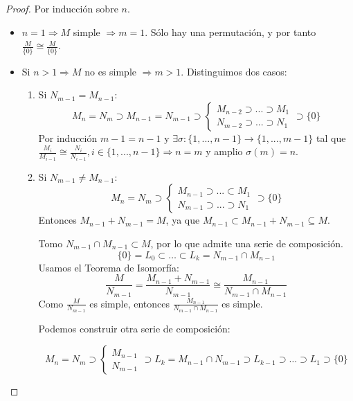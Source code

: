 \documentclass[11pt,a4paper]{article}
\theoremstyle{break}
\begin{document}
\begin{proof}
Por inducción sobre $n$.
\begin{itemize}
\item $n = 1 \Rightarrow M$ simple $\Rightarrow m = 1$. Sólo hay una permutación, y por tanto $\frac{M}{\{0\}} \cong \frac{M}{\{0\}}$.
\item Si $n > 1 \Rightarrow M$ no es simple $\Rightarrow m > 1$. Distinguimos dos casos:
\begin{enumerate}[label=\underline{Caso \alph*}:]
\item Si $N_{m-1} = M_{n-1}$:
\begin{equation*}
M_{n} = N_{m} \supset M_{n-1} = N_{m-1} \supset
\begin{cases}
M_{n-2} \supset ... \supset M_{1} \\
N_{m-2} \supset ... \supset N_{1}
\end{cases}
\supset \{0\}
\end{equation*}
Por inducción $m-1 = n-1$ y $\exists \sigma: \{1, ..., n-1\} \to \{1, ..., m-1\}$ tal que $\frac{M_{i}}{M_{i-1}} \cong \frac{N_{i}}{N_{i-1}}, i \in \{1, ..., n-1\} \Rightarrow n = m$ y amplio $\sigma(m) = n$.

\item Si $N_{m-1} \neq M_{n-1}$:
\begin{equation*}
M_{n} = N_{m} \supset
\begin{cases}
M_{n-1} \supset ... \subset M_{1} \\
N_{m-1} \supset ... \supset N_{1}
\end{cases}
\supset \{0\}
\end{equation*}
Entonces $M_{n-1} + N_{m-1} = M$, ya que $M_{n-1} \subset M_{n-1} + N_{m-1} \subseteq M$.

Tomo $N_{m-1} \cap M_{n-1} \subset M$, por lo que admite una serie de composición.
$$\{0\} = L_{0} \subset \dots \subset L_{k} = N_{m-1} \cap M_{n-1}$$
Usamos el Teorema de Isomorfía:
$$\frac{M}{N_{m-1}} = \frac{M_{n-1} + N_{m-1}}{N_{m-1}} \cong \frac{M_{n-1}}{N_{m-1} \cap M_{n-1}}$$
Como $\frac{M}{N_{m-1}}$ es simple, entonces $\frac{M_{n-1}}{N_{m-1} \cap M_{n-1}}$ es simple.

Podemos construir otra serie de composición:
\begin{scriptsize}
\begin{equation*}
M_{n} = N_{m} \supset
\begin{cases}
M_{n-1} \\
N_{m-1}
\end{cases}
\supset L_{k} = M_{n-1} \cap N_{m-1} \supset L_{k-1} \supset \dots \supset L_{1} \supset \{0\}
\end{equation*}
\end{scriptsize}


\end{enumerate}
\end{itemize}
\end{proof}
\end{document}
